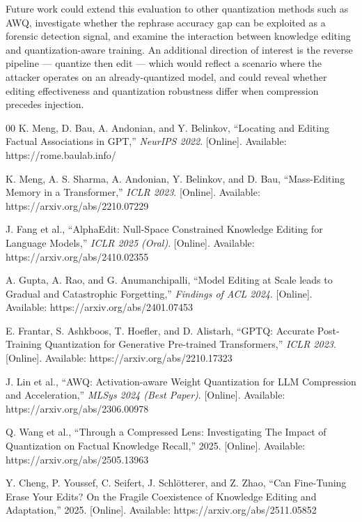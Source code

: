 \documentclass[conference]{IEEEtran}
\begin{document}
Future work could extend this evaluation to other quantization methods such as AWQ, investigate whether the rephrase accuracy gap can be exploited as a forensic detection signal, and examine the interaction between knowledge editing and quantization-aware training. An additional direction of interest is the reverse pipeline --- quantize then edit --- which would reflect a scenario where the attacker operates on an already-quantized model, and could reveal whether editing effectiveness and quantization robustness differ when compression precedes injection.

\begin{thebibliography}{00}
     K. Meng, D. Bau, A. Andonian, and Y. Belinkov, ``Locating and Editing Factual Associations in GPT,'' \textit{NeurIPS 2022}. [Online]. Available: https://rome.baulab.info/

     K. Meng, A. S. Sharma, A. Andonian, Y. Belinkov, and D. Bau, ``Mass-Editing Memory in a Transformer,'' \textit{ICLR 2023}. [Online]. Available: https://arxiv.org/abs/2210.07229

     J. Fang et al., ``AlphaEdit: Null-Space Constrained Knowledge Editing for Language Models,'' \textit{ICLR 2025 (Oral)}. [Online]. Available: https://arxiv.org/abs/2410.02355

     A. Gupta, A. Rao, and G. Anumanchipalli, ``Model Editing at Scale leads to Gradual and Catastrophic Forgetting,'' \textit{Findings of ACL 2024}. [Online]. Available: https://arxiv.org/abs/2401.07453

     E. Frantar, S. Ashkboos, T. Hoefler, and D. Alistarh, ``GPTQ: Accurate Post-Training Quantization for Generative Pre-trained Transformers,'' \textit{ICLR 2023}. [Online]. Available: https://arxiv.org/abs/2210.17323

     J. Lin et al., ``AWQ: Activation-aware Weight Quantization for LLM Compression and Acceleration,'' \textit{MLSys 2024 (Best Paper)}. [Online]. Available: https://arxiv.org/abs/2306.00978

     Q. Wang et al., ``Through a Compressed Lens: Investigating The Impact of Quantization on Factual Knowledge Recall,'' 2025. [Online]. Available: https://arxiv.org/abs/2505.13963

     Y. Cheng, P. Youssef, C. Seifert, J. Schl\"{o}tterer, and Z. Zhao, ``Can Fine-Tuning Erase Your Edits? On the Fragile Coexistence of Knowledge Editing and Adaptation,'' 2025. [Online]. Available: https://arxiv.org/abs/2511.05852


\end{thebibliography}
\end{document}
